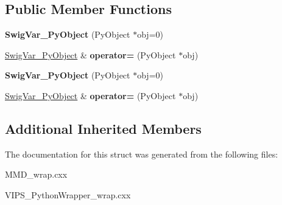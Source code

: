 \subsection*{Public Member Functions}
\begin{DoxyCompactItemize}
\item 
{\bfseries Swig\+Var\+\_\+\+Py\+Object} (Py\+Object $\ast$obj=0)\hypertarget{structswig_1_1SwigVar__PyObject_a2b61f843215bceaff8ec2ea6e92d46c2}{}\label{structswig_1_1SwigVar__PyObject_a2b61f843215bceaff8ec2ea6e92d46c2}

\item 
\hyperlink{structswig_1_1SwigVar__PyObject}{Swig\+Var\+\_\+\+Py\+Object} \& {\bfseries operator=} (Py\+Object $\ast$obj)\hypertarget{structswig_1_1SwigVar__PyObject_a7e6053b64cf6e787b99a67b09cdc6d89}{}\label{structswig_1_1SwigVar__PyObject_a7e6053b64cf6e787b99a67b09cdc6d89}

\item 
{\bfseries Swig\+Var\+\_\+\+Py\+Object} (Py\+Object $\ast$obj=0)\hypertarget{structswig_1_1SwigVar__PyObject_a2b61f843215bceaff8ec2ea6e92d46c2}{}\label{structswig_1_1SwigVar__PyObject_a2b61f843215bceaff8ec2ea6e92d46c2}

\item 
\hyperlink{structswig_1_1SwigVar__PyObject}{Swig\+Var\+\_\+\+Py\+Object} \& {\bfseries operator=} (Py\+Object $\ast$obj)\hypertarget{structswig_1_1SwigVar__PyObject_a7e6053b64cf6e787b99a67b09cdc6d89}{}\label{structswig_1_1SwigVar__PyObject_a7e6053b64cf6e787b99a67b09cdc6d89}

\end{DoxyCompactItemize}
\subsection*{Additional Inherited Members}


The documentation for this struct was generated from the following files\+:\begin{DoxyCompactItemize}
\item 
M\+M\+D\+\_\+wrap.\+cxx\item 
V\+I\+P\+S\+\_\+\+Python\+Wrapper\+\_\+wrap.\+cxx\end{DoxyCompactItemize}
